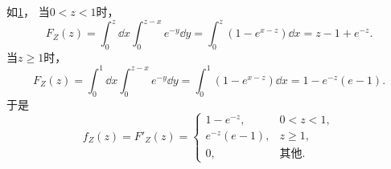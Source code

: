 \begin{example}
\begin{solution}
\begin{figure}
	\caption{}
	\label{figure:多维随机变量及其分布.二维连续型随机变量函数的分布.例2}
\end{figure}
如\cref{figure:多维随机变量及其分布.二维连续型随机变量函数的分布.例2}，
当\(0<z<1\)时，\begin{equation*}
	F_Z(z) = \int_0^z \dd{x} \int_0^{z-x} e^{-y} \dd{y}
	= \int_0^z (1-e^{x-z}) \dd{x}
	= z-1+e^{-z}.
\end{equation*}
当\(z\geq1\)时，\begin{equation*}
	F_Z(z) = \int_0^1 \dd{x} \int_0^{z-x} e^{-y} \dd{y}
	= \int_0^1 (1-e^{x-z}) \dd{x}
	= 1-e^{-z}(e-1).
\end{equation*}
于是\[
	f_Z(z) = F'_Z(z)
	= \begin{cases}
		1 - e^{-z}, & 0<z<1, \\
		e^{-z}(e-1), & z\geq1, \\
		0, & \text{其他}.
	\end{cases}
\]
\end{solution}
\end{example}

